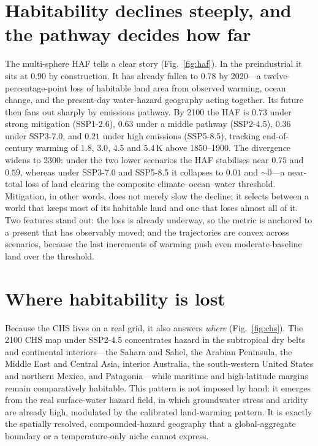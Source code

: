 \documentclass[10pt]{article}
\begin{document}
\section*{Habitability declines steeply, and the pathway decides how far}
The multi-sphere HAF tells a clear story (Fig.~\ref{fig:haf}). In the
preindustrial it sits at $0.90$ by construction. It has already fallen to $0.78$
by 2020—a twelve-percentage-point loss of habitable land area from observed
warming, ocean change, and the present-day water-hazard geography acting
together. Its future then fans out sharply by emissions pathway. By 2100 the HAF
is $0.73$ under strong mitigation (SSP1-2.6), $0.63$ under a middle pathway
(SSP2-4.5), $0.36$ under SSP3-7.0, and $0.21$ under high emissions (SSP5-8.5),
tracking end-of-century warming of $1.8$, $3.0$, $4.5$ and $5.4$\,K above
1850--1900. The divergence widens to 2300: under the two lower scenarios the HAF
stabilises near $0.75$ and $0.59$, whereas under SSP3-7.0 and SSP5-8.5 it collapses
to $0.01$ and $\sim\!0$—a near-total loss of land clearing the composite
climate--ocean--water threshold. Mitigation, in other words, does not merely slow
the decline; it selects between a world that keeps most of its habitable land and
one that loses almost all of it. Two features stand out: the loss is already
underway, so the metric is anchored to a present that has observably moved; and
the trajectories are convex across scenarios, because the last increments of
warming push even moderate-baseline land over the threshold.

\section*{Where habitability is lost}
Because the CHS lives on a real grid, it also answers \emph{where}
(Fig.~\ref{fig:chs}). The 2100 CHS map under SSP2-4.5 concentrates hazard in the
subtropical dry belts and continental interiors—the Sahara and Sahel, the Arabian
Peninsula, the Middle East and Central Asia, interior Australia, the
south-western United States and northern Mexico, and Patagonia—while maritime and
high-latitude margins remain comparatively habitable. This pattern is not imposed
by hand: it emerges from the real surface-water hazard field, in which groundwater
stress and aridity are already high, modulated by the calibrated land-warming
pattern. It is exactly the spatially resolved, compounded-hazard geography that a
global-aggregate boundary or a temperature-only niche cannot express.
\end{document}
